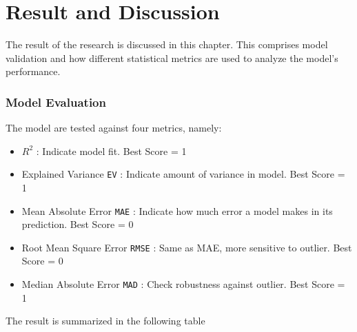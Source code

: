 \chapter{Result and Discussion} \label{chp:result}

The result of the research is discussed in this chapter. 
This comprises model validation and how different statistical metrics are used to analyze the model's performance. 

\subsection{Model Evaluation}

The model are tested against four metrics, namely:

\begin{itemize}
    \item $R^2$ : Indicate model fit. Best Score = 1
    \item Explained Variance \verb|EV| : Indicate amount of variance in model. Best Score = 1
    \item Mean Absolute Error \verb|MAE| : Indicate how much error a model makes in its prediction. Best Score = 0
    \item Root Mean Square Error \verb|RMSE| : Same as MAE, more sensitive to outlier. Best Score = 0
    \item Median Absolute Error \verb|MAD| : Check robustness against outlier. Best Score = 1
\end{itemize}

The result is summarized in the following table

\begin{table}[ht]
    \centering
\caption{Model performance}\label{table1}
\end{table}
 
